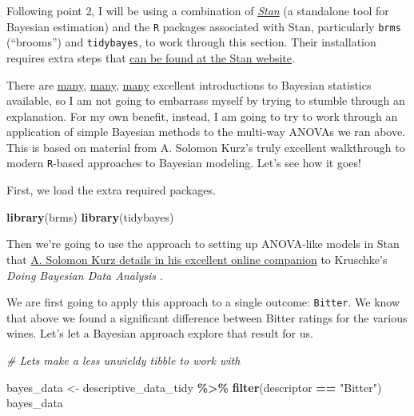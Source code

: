 \documentclass[
]{book}
\newenvironment{Shaded}{\begin{snugshade}}{\end{snugshade}}
\newcommand{\CommentTok}[1]{\textcolor[rgb]{0.56,0.35,0.01}{\textit{#1}}}
\newcommand{\FunctionTok}[1]{\textcolor[rgb]{0.13,0.29,0.53}{\textbf{#1}}}
\newcommand{\NormalTok}[1]{#1}
\newcommand{\OtherTok}[1]{\textcolor[rgb]{0.56,0.35,0.01}{#1}}
\newcommand{\SpecialCharTok}[1]{\textcolor[rgb]{0.81,0.36,0.00}{\textbf{#1}}}
\newcommand{\StringTok}[1]{\textcolor[rgb]{0.31,0.60,0.02}{#1}}
\begin{document}
Following point 2, I will be using a combination of \href{https://mc-stan.org/}{\emph{Stan}} (a standalone tool for Bayesian estimation) and the \texttt{R} packages associated with Stan, particularly \texttt{brms} (``brooms'') and \texttt{tidybayes}, to work through this section. Their installation requires extra steps that \href{https://mc-stan.org/users/interfaces/}{can be found at the Stan website}.

There are \href{https://xcelab.net/rm/statistical-rethinking/}{many}, \href{https://avehtari.github.io/ROS-Examples/}{many}, \href{https://sites.google.com/site/doingbayesiandataanalysis/}{many} excellent introductions to Bayesian statistics available, so I am not going to embarrass myself by trying to stumble through an explanation. For my own benefit, instead, I am going to try to work through an application of simple Bayesian methods to the multi-way ANOVAs we ran above. This is based on material from A. Solomon Kurz's \citeyearpar{kurzDoingBayesianDataAnalysis2023} truly excellent walkthrough to modern \texttt{R}-based approaches to Bayesian modeling. Let's see how it goes!

First, we load the extra required packages.

\begin{Shaded}
\begin{Highlighting}[]
\FunctionTok{library}\NormalTok{(brms)}
\FunctionTok{library}\NormalTok{(tidybayes)}
\end{Highlighting}
\end{Shaded}

Then we're going to use the approach to setting up ANOVA-like models in Stan that \href{https://bookdown.org/content/3686/metric-predicted-variable-with-multiple-nominal-predictors.html}{A. Solomon Kurz details in his excellent online companion} to Kruschke's \emph{Doing Bayesian Data Analysis} \citet{kruschkeDoing2014}.

We are first going to apply this approach to a single outcome: \texttt{Bitter}. We know that above we found a significant difference between Bitter ratings for the various wines. Let's let a Bayesian approach explore that result for us.

\begin{Shaded}
\begin{Highlighting}[]
\CommentTok{\# Let\textquotesingle{}s make a less unwieldy tibble to work with}

\NormalTok{bayes\_data }\OtherTok{\textless{}{-}} 
\NormalTok{  descriptive\_data\_tidy }\SpecialCharTok{\%\textgreater{}\%}
  \FunctionTok{filter}\NormalTok{(descriptor }\SpecialCharTok{==} \StringTok{"Bitter"}\NormalTok{)}
\NormalTok{bayes\_data}
\end{Highlighting}
\end{Shaded}
\end{document}
